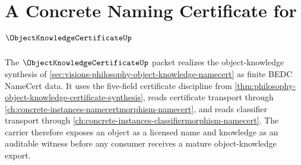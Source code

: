 \chapter{A Concrete Naming Certificate for $\ObjectKnowledgeCertificateUp$}
\label{ch:concrete-instances-objectknowledgecertificate-namecert}

The $\ObjectKnowledgeCertificateUp$ packet realizes the object-knowledge synthesis of \autoref{sec:visions-philosophy-object-knowledge-namecert} as finite BEDC NameCert data. It uses the five-field certificate discipline from \autoref{thm:philosophy-object-knowledge-certificate-synthesis}, reads certificate transport through \autoref{ch:concrete-instances-namecertmorphism-namecert}, and reads classifier transport through \autoref{ch:concrete-instances-classifiermorphism-namecert}. The carrier therefore exposes an object as a licensed name and knowledge as an auditable witness before any consumer receives a mature object-knowledge export.

